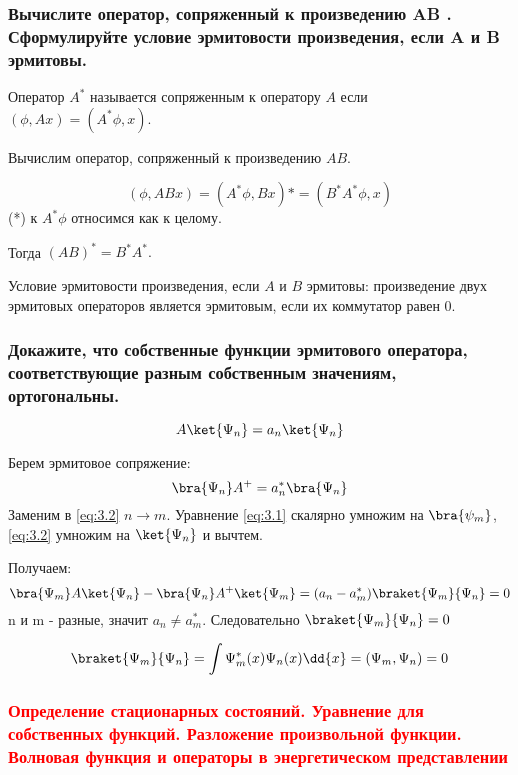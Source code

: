 \subsubsection{Вычислите оператор, сопряженный к произведению AB . Сформулируйте условие эрмитовости произведения, если A и B эрмитовы.}



Оператор $A^*$ называется сопряженным к оператору $A$ если $(\phi, Ax)=(A^*\phi,x).$

Вычислим оператор, сопряженный к произведению $AB$.

$$(\phi, ABx)= (A^*\phi,Bx)*=(B^*A^*\phi,x) $$
(*) к $A^*\phi$  относимся как к целому.

Тогда $(AB)^*=B^*A^*.$

Условие эрмитовости произведения, если $A$ и  $B$ эрмитовы:
произведение двух эрмитовых операторов является эрмитовым, если их коммутатор равен 0.

\subsubsection{Докажите, что собственные функции эрмитового оператора, соответствующие разным собственным значениям, ортогональны.}


\begin{equation}
\label{eq:3.1}
A\ket{\Psi_n}=a_n\ket{\Psi_n} 	
\end{equation}

Берем эрмитовое сопряжение:
\begin{equation}
	\label{eq:3.2}
\bra{\Psi_n}A^+=a_n^*\bra{\Psi_n} 
\end{equation}
Заменим в \eqref{eq:3.2} $n\rightarrow m$. Уравнение \eqref{eq:3.1} скалярно умножим на $\bra{\psi_m}$, \eqref{eq:3.2} умножим на $\ket{\Psi_n}$  и вычтем.

Получаем:
\begin{equation}
	\bra{\Psi_m}A\ket{\Psi_n}-\bra{\Psi_n}A^+\ket{\Psi_m}=(a_n-a^*_m)
	\braket{\Psi_m}{\Psi_n}=0
\end{equation}
n и m - разные, значит $a_n\neq a_m^*$. Следовательно $\braket{\Psi_m}{\Psi_n}=0$

$$\big \braket{\Psi_m}{\Psi_n}=\int \Psi_m^*(x)\Psi_n(x)\dd{x}=(\Psi_m,\Psi_n)=0 $$

\subsubsection{\textcolor{red} {Определение стационарных состояний. Уравнение для собственных функций. Разложение произвольной функции. Волновая функция и операторы в энергетическом представлении}}

